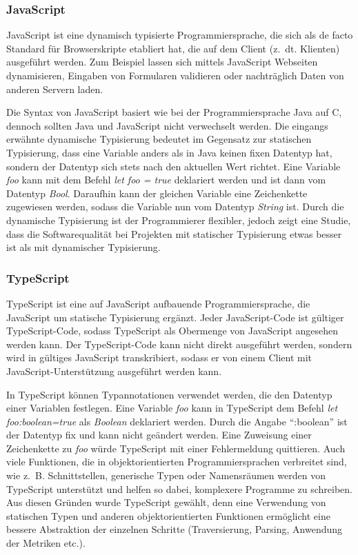 \subsubsection{JavaScript}
JavaScript ist eine dynamisch typisierte Programmiersprache, die sich als de facto Standard  für Browserskripte etabliert hat, die auf dem Client (z.~dt. Klienten) ausgeführt werden. Zum Beispiel lassen sich mittels JavaScript Webseiten dynamisieren, Eingaben von Formularen validieren oder nachträglich Daten von anderen Servern laden. 

Die Syntax von JavaScript basiert wie bei der Programmiersprache Java auf C, dennoch sollten Java und JavaScript nicht verwechselt werden. Die eingangs erwähnte dynamische Typisierung bedeutet im Gegensatz zur statischen Typisierung, dass eine Variable anders als in Java keinen fixen Datentyp hat, sondern der Datentyp sich stets nach den aktuellen Wert richtet. Eine Variable \textit{foo} kann mit dem Befehl \textit{ let foo = true} deklariert werden und ist dann vom Datentyp \textit{Bool}. Daraufhin kann der gleichen Variable eine Zeichenkette zugewiesen werden, sodass die Variable nun vom Datentyp \textit{String} ist. Durch die dynamische Typisierung ist der Programmierer flexibler, jedoch zeigt eine Studie, dass die Softwarequalität bei Projekten mit statischer Typisierung etwas besser ist als mit dynamischer Typisierung\cite[S. 155ff.]{Ray2014}.

\subsubsection{TypeScript}
TypeScript ist eine auf JavaScript aufbauende Programmiersprache, die JavaScript um statische Typisierung ergänzt. Jeder JavaScript-Code ist gültiger TypeScript-Code, sodass TypeScript als Obermenge von JavaScript angesehen werden kann. Der TypeScript-Code kann nicht direkt ausgeführt werden, sondern wird in gültiges JavaScript transkribiert, sodass er von einem Client mit JavaScript-Unterstützung ausgeführt werden kann. 

In TypeScript können Typannotationen verwendet werden, die den Datentyp einer Variablen festlegen. Eine Variable \textit{foo} kann in TypeScript dem Befehl \textit{let foo:boolean=true} als \textit{Boolean} deklariert werden. Durch die Angabe \enquote{:boolean} ist der Datentyp fix und kann nicht geändert werden. Eine Zuweisung einer Zeichenkette zu \textit{foo} würde TypeScript mit einer Fehlermeldung quittieren. Auch viele Funktionen, die in objektorientierten Programmiersprachen verbreitet sind, wie z.~B. Schnittstellen, generische Typen oder Namensräumen werden von TypeScript unterstützt und helfen so dabei, komplexere Programme zu schreiben. Aus diesen Gründen wurde TypeScript gewählt, denn eine Verwendung von statischen Typen und anderen objektorientierten Funktionen ermöglicht eine bessere Abstraktion der einzelnen Schritte (Traversierung, Parsing, Anwendung der Metriken etc.). 

